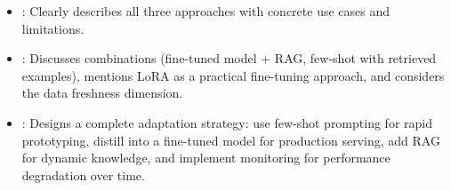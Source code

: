 \begin{interviewq}

\goodgreat
\begin{itemize}
\item {}: Clearly describes all three approaches with
  concrete use cases and limitations.
\item {}: Discusses combinations (fine-tuned model + RAG,
  few-shot with retrieved examples), mentions LoRA as a practical
  fine-tuning approach, and considers the data freshness dimension.
\item {}: Designs a complete adaptation strategy: use
  few-shot prompting for rapid prototyping, distill into a fine-tuned
  model for production serving, add RAG for dynamic knowledge, and
  implement monitoring for performance degradation over time.
\end{itemize}

\end{interviewq}

